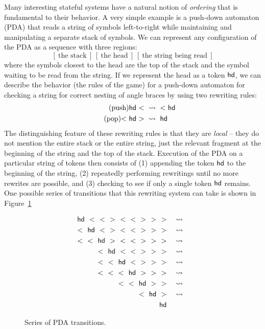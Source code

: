 Many interesting stateful systems have a natural notion of {\it
  ordering} that is fundamental to their behavior. A very simple
example is a push-down automaton (PDA) that reads a string of symbols
left-to-right while maintaining and manipulating a separate stack of
symbols. We can represent any configuration of the PDA as a sequence
with three regions:
\[
[~\mbox{the stack}~]
~
[~\mbox{the head}~]
~
[~\mbox{the string being read}~]
\]
where the symbols closest to the head are the top of the stack and the
symbol waiting to be read from the string. If we represent the head as
a token ${\sf hd}$, we can describe the behavior (the rules of the
game) for a push-down automaton for checking a string for correct
nesting of angle braces by using two rewriting rules:
\begin{align}
\tag{push} {\sf hd}~{<} ~&\rightsquigarrow~ {<}~{\sf hd}
\\
\tag{pop} {<}~{\sf hd}~{>} ~&\rightsquigarrow~ {\sf hd}
\end{align}
The distinguishing feature of these rewriting rules is that they are
{\it local} -- they do not mention the entire stack or the entire
string, just the relevant fragment at the beginning of the string and
the top of the stack. Execution of the PDA on a particular string of
tokens then consists of (1) appending the token ${\sf hd}$ to the
beginning of the string, (2) repeatedly performing rewritings until no
more rewrites are possible, and (3) checking to see if only a single
token ${\sf hd}$ remains. One possible series of transitions that this
rewriting system can take is shown in Figure~\ref{fig:pda-transitions}

\begin{figure}
\begin{align*}
{\sf hd}~~{<}~~{<}~~{>}~~{<}~~{<}~~{>}~~{>}~~{>}
& ~~~\rightsquigarrow~~\\
{<}~~{\sf hd}~~{<}~~{>}~~{<}~~{<}~~{>}~~{>}~~{>}
& ~~~\rightsquigarrow~~\\
{<}~~{<}~~{\sf hd}~~{>}~~{<}~~{<}~~{>}~~{>}~~{>}
& ~~~\rightsquigarrow~~\\
{<}~~{\sf hd}~~{<}~~{<}~~{>}~~{>}~~{>}
& ~~~\rightsquigarrow~~\\
{<}~~{<}~~{\sf hd}~~{<}~~{>}~~{>}~~{>}
& ~~~\rightsquigarrow~~\\
{<}~~{<}~~{<}~~{\sf hd}~~{>}~~{>}~~{>}
& ~~~\rightsquigarrow~~\\
{<}~~{<}~~{\sf hd}~~{>}~~{>}
& ~~~\rightsquigarrow~~\\
{<}~~{\sf hd}~~{>}
& ~~~\rightsquigarrow~~\\
{\sf hd} &
\end{align*}
\caption{Series of PDA transitions.}
\label{fig:pda-transitions}
\end{figure}

